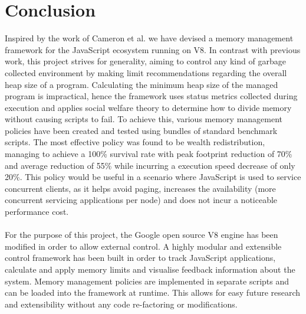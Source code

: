 \documentclass{l4proj}
\begin{document}
\chapter{Conclusion}
\hspace*{3em} Inspired by the work of Cameron et al.\cite{forseti} we have devised a memory management framework for the JavaScript ecosystem running on V8. In contrast with previous work, this project strives for generality, aiming to control any kind of garbage collected environment by making limit recommendations regarding the overall heap size of a program. Calculating the minimum heap size of the managed program is impractical, hence the framework uses status metrics collected during execution and applies social welfare theory to determine how to divide memory without causing scripts to fail. To achieve this, various memory management policies have been created and tested using bundles of standard benchmark scripts. The most effective policy was found to be wealth redistribution, managing to achieve a 100\% survival rate with peak footprint reduction of 70\% and average reduction of 55\% while incurring a execution speed decrease of only 20\%. This policy would be useful in a scenario where JavaScript is used to service concurrent clients, as it helps avoid paging, increases the availability (more concurrent servicing applications per node) and does not incur a noticeable performance cost.
\\\\
\hspace*{3em} For the purpose of this project, the Google open source V8 engine has been modified in order to allow external control. A highly modular and extensible control framework has been built in order to track JavaScript applications, calculate and apply memory limits and visualise feedback information about the system. Memory management policies are implemented in separate scripts and can be loaded into the framework at runtime. This allows for easy future research and extensibility without any code re-factoring or modifications. 
\end{document}
